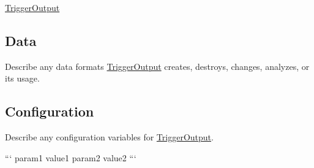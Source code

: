 \hyperlink{classTriggerOutput}{Trigger\-Output}

\subsection*{Data}

Describe any data formats \hyperlink{classTriggerOutput}{Trigger\-Output} creates, destroys, changes, analyzes, or its usage.

\subsection*{Configuration}

Describe any configuration variables for \hyperlink{classTriggerOutput}{Trigger\-Output}.

``` param1 value1 param2 value2 ``` 